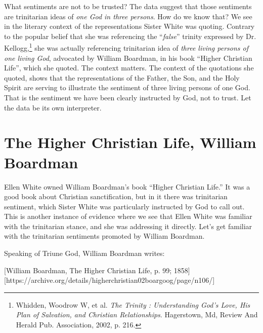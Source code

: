 What sentiments are not to be trusted? The data suggest that those sentiments are trinitarian ideas of \textit{one God in three persons}. How do we know that? We see in the literary context of the representations Sister White was quoting. Contrary to the popular belief that she was referencing the “\textit{false}” trinity expressed by Dr. Kellogg,\footnote{Whidden, Woodrow W, et al. \textit{The Trinity : Understanding God’s Love, His Plan of Salvation, and Christian Relationships}. Hagerstown, Md, Review And Herald Pub. Association, 2002, p. 216.} she was actually referencing trinitarian idea of \textit{three living persons of one living God}, advocated by William Boardman, in his book “Higher Christian Life”, which she quoted. The context matters. The context of the quotations she quoted, shows that the representations of the Father, the Son, and the Holy Spirit are serving to illustrate the sentiment of three living persons of one God. That is the sentiment we have been clearly instructed by God, not to trust. Let the data be its own interpreter.

\section*{The Higher Christian Life, William Boardman}

Ellen White owned William Boardman's book “Higher Christian Life.” It was a good book about Christian sanctification, but in it there was trinitarian sentiment, which Sister White was particularly instructed by God to call out. This is another instance of evidence where we see that Ellen White was familiar with the trinitarian stance, and she was addressing it directly. Let's get familiar with the trinitarian sentiments promoted by William Boardman.

Speaking of Triune God, William Boardman writes:

[William Boardman, The Higher Christian Life, p. 99; 1858][https://archive.org/details/higherchristian02boargoog/page/n106/]

